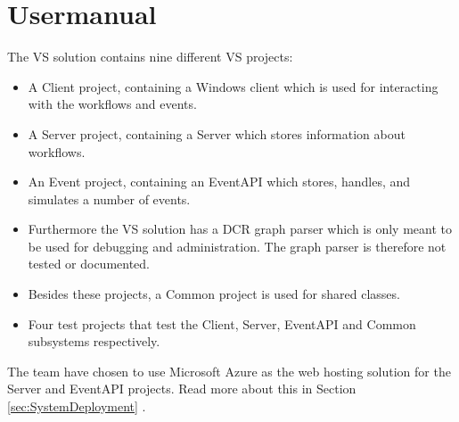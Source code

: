\section{Usermanual \label{sec:Usermanual}}
The VS solution contains nine different VS projects:
\begin{itemize}
\item A Client project, containing a Windows client which is used for interacting with the workflows and events.
\item A Server project, containing a Server which stores information about workflows. 
\item An Event project, containing an EventAPI which stores, handles, and simulates a number of events.
\item Furthermore the VS solution has a DCR graph parser which is only meant to be used for debugging and administration. The graph parser is therefore not tested or documented.
\item Besides these projects, a Common project is used for shared classes.
\item Four test projects that test the Client, Server, EventAPI and Common subsystems respectively.
\end{itemize}
The team have chosen to use Microsoft Azure as the web hosting solution for the Server and EventAPI projects. Read more about this in Section \ref{sec:SystemDeployment} . \newline




